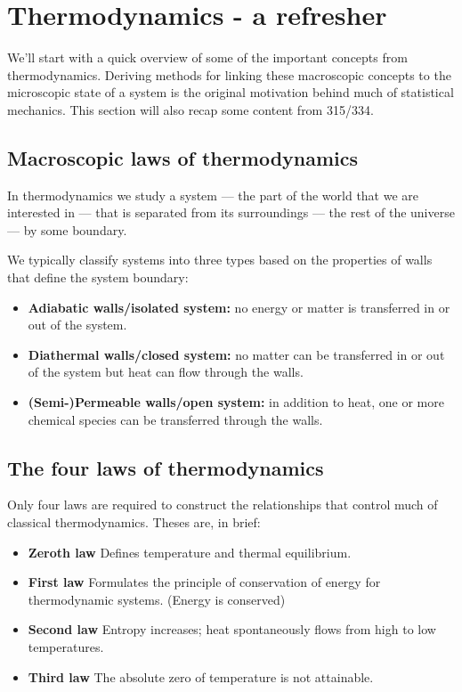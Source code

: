 \section{Thermodynamics - a refresher}
We'll start with a quick overview of some of the important concepts from thermodynamics. Deriving methods for linking these macroscopic concepts to the microscopic state of a system is the original motivation behind much of statistical mechanics. This section will also recap some content from 315/334.

\subsection{Macroscopic laws of thermodynamics}
In thermodynamics we study a system --- the part of the world that we are interested in --- that is separated from its surroundings --- the rest of the universe --- by some boundary.

We typically classify systems into three types based on the properties of walls that define the system boundary:

\begin{itemize}
\item {\bf Adiabatic walls/isolated system:} no energy or matter is transferred in or out of the system.
\item {\bf Diathermal walls/closed system:} no matter can be transferred in or out of the system but heat can flow through the walls.
\item {\bf (Semi-)Permeable walls/open system:}  in addition to heat, one or more chemical species can be transferred through the walls. 
\end{itemize}

\subsection*{The four laws of thermodynamics}
Only four laws are required to construct the relationships that control much of classical thermodynamics. Theses are, in brief:
\begin{itemize}
\item {\bf Zeroth law} Defines temperature and thermal equilibrium. 
\item {\bf First law} Formulates the principle of conservation of energy for thermodynamic systems. (Energy is conserved)
\item {\bf Second law} Entropy increases; heat spontaneously flows from high to low temperatures.
\item {\bf Third law} The absolute zero of temperature is not attainable.  
\end{itemize}


